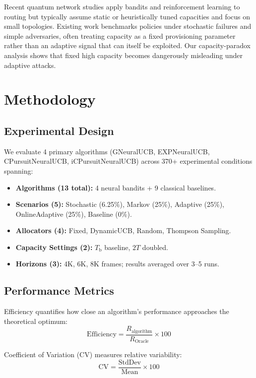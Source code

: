 \documentclass[sigconf,anonymous]{acmart}
\newcommand{\Tb}{T_{\text{b}}}
\newcommand{\TwoT}{2T}
\begin{document}
Recent quantum network studies apply bandits and reinforcement learning to routing but typically assume static or heuristically tuned capacities and focus on small topologies. Existing work benchmarks policies under stochastic failures and simple adversaries, often treating capacity as a fixed provisioning parameter rather than an adaptive signal that can itself be exploited. Our capacity-paradox analysis shows that fixed high capacity becomes dangerously misleading under adaptive attacks.

\section{Methodology}
\label{sec:methodology}

\subsection{Experimental Design}

We evaluate 4 primary algorithms (GNeuralUCB, EXPNeuralUCB, CPursuitNeuralUCB, iCPursuitNeuralUCB) across 370+ experimental conditions spanning:

\begin{itemize}
  \item \textbf{Algorithms (13 total):} 4 neural bandits + 9 classical baselines.
  \item \textbf{Scenarios (5):} Stochastic (6.25\%), Markov (25\%), Adaptive (25\%), OnlineAdaptive (25\%), Baseline (0\%).
  \item \textbf{Allocators (4):} Fixed, DynamicUCB, Random, Thompson Sampling.
  \item \textbf{Capacity Settings (2):} $\Tb$ baseline, $\TwoT$ doubled.
  \item \textbf{Horizons (3):} 4K, 6K, 8K frames; results averaged over 3--5 runs.
\end{itemize}

\subsection{Performance Metrics}

Efficiency quantifies how close an algorithm's performance approaches the theoretical optimum:
\[
\text{Efficiency} = \frac{R_{\text{algorithm}}}{R_{\text{Oracle}}} \times 100
\]

Coefficient of Variation (CV) measures relative variability:
\[
\text{CV} = \frac{\text{StdDev}}{\text{Mean}} \times 100
\]
\end{document}
